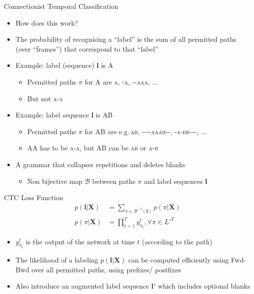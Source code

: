 \begin{frame}{Connectionist Temporal Classification}
  \begin{itemize}
  \item How does this work?
  \item The probability of recognising a ``label'' is the sum of all permitted paths
    (over ``frames'') that correspond to that ``label''
  \item Example: label (sequence) $\boldsymbol{l}$ is \textsc{A}
    \begin{itemize}
    \item Permitted paths $\pi$ for \textsc{A} are \textsc{a}, \textsc{-a}, \textsc{{-}-aaa}, ...
    \item But not \textsc{a-a}
    \end{itemize}
  \item Example: label sequence $\boldsymbol{l}$ is \textsc{AB}
    \begin{itemize}
    \item Permitted paths $\pi$ for \textsc{AB} are e.g.\,\textsc{ab}, \textsc{{-}-{-}-aaab-{-}}, \textsc{-a-bb-{-}-}, ...
      \item \textsc{AA} has to be \textsc{a-a}, but \textsc{AB} can be \textsc{ab} or \textsc{a-b}
    \end{itemize}
  \item A grammar that collapses repetitions and deletes blanks
    \begin{itemize}
    \item Non bijective map $\mathcal{B}$ between paths $\pi$ and label sequences $\boldsymbol{l}$
    \end{itemize}
  \end{itemize}
\end{frame}

\begin{frame}{CTC Loss Function}
  \begin{align}
    p(\boldsymbol{l}|\boldsymbol{X})   & = \sum_{\pi \in \mathcal{B}^{-1}(\boldsymbol{l})} p(\pi|\boldsymbol{X})\\
    p(\pi|\boldsymbol{X}) & = \prod_{t=1}^T y^t_{\pi_t}, \forall \pi \in L'^T
  \end{align}
  \begin{itemize}
  \item $y^t_{\pi_t}$ is the output of the network at time $t$ (according to the path)
  \item The likelihood of a labeling $p(\boldsymbol{l}|\boldsymbol{X})$ can be computed efficiently using Fwd-Bwd over all permitted paths, using prefixes/ postfixes
  \item Also introduce an augmented label sequence $\boldsymbol{l'}$ which includes optional blanks
  \end{itemize}
\end{frame}

